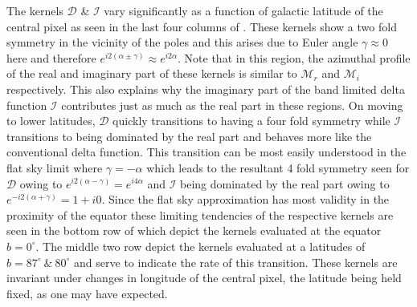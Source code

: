 The kernels $\mathcal{D}$ \& $\mathcal{I}$ vary significantly as a function of galactic latitude of the central pixel as seen in the last four columns of . These kernels show a two fold symmetry in the vicinity of the poles and this arises due to Euler angle $\gamma \approx 0$ here and therefore $e^{i2(\alpha \pm \gamma)} \approx e^{i2\alpha}$. Note that in this region, the azimuthal profile of the real and imaginary part of these kernels  is similar to $\mathcal{M}_r$ and $\mathcal{M}_i$ respectively.  This also explains why the imaginary part of the band limited delta function $\mathcal{I}$ contributes just as much as the real part in these regions. On moving to lower latitudes, $\mathcal{D}$ quickly transitions to having a four fold symmetry while $\mathcal{I}$ transitions to being dominated by the real part and behaves more like the conventional delta function. This transition can be most easily understood in the flat sky limit where $\gamma = -\alpha$ which leads to the resultant 4 fold symmetry seen for $\mathcal{D}$ owing to $e^{i2(\alpha - \gamma)} =e^{i4\alpha}$ and $\mathcal{I}$ being dominated by the real part owing to $e^{-i2(\alpha + \gamma)} =1 + i0$. Since the flat sky approximation has most validity in the proximity of the equator these limiting tendencies of the respective kernels are seen in the bottom row of  which depict the kernels evaluated at the equator $b=0^{\circ}$. The middle two row depict the kernels evaluated at a latitudes of $b=87^{\circ}~\&~ 80^{\circ}$ and serve to indicate the rate of this transition. These kernels are invariant under changes in longitude of the central pixel, the latitude being held fixed, as one may have expected.

